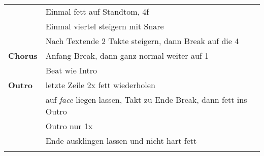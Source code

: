 \begin{tabular}{p{1.6cm}l}
	                & Einmal fett auf Standtom, 4f                                             \\
	                & Einmal viertel steigern mit Snare                                        \\
	                & Nach Textende 2 Takte steigern, dann Break auf die 4                     \\
	\textbf{Chorus} & Anfang Break, dann ganz normal weiter auf 1                              \\
	                & Beat wie Intro                                                           \\
	\textbf{Outro}  & letzte Zeile 2x fett wiederholen                                         \\
	                & auf \textit{face} liegen lassen, Takt zu Ende Break, dann fett ins Outro \\
	                & Outro nur 1x                                                             \\
	                & Ende ausklingen lassen und nicht hart fett                               \\
	                &                                                                          \\
\end{tabular}
